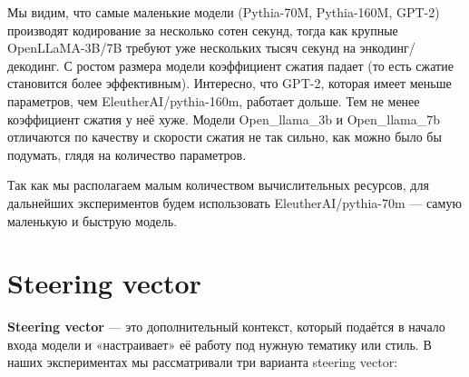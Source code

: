 \documentclass[a4paper,11pt]{article}
\begin{document}
\begin{table}[ht]
\centering
{}
\caption{Результаты по моделям}
\end{table}

Мы видим, что самые маленькие модели (Pythia-70M, Pythia-160M, GPT-2) производят кодирование за несколько сотен секунд, тогда как крупные OpenLLaMA-3B/7B требуют уже нескольких тысяч секунд на энкодинг/декодинг. С ростом размера модели коэффициент сжатия падает (то есть сжатие становится более эффективным). Интересно, что GPT-2, которая имеет меньше параметров, чем EleutherAI/pythia-160m, работает дольше. Тем не менее коэффициент сжатия у неё хуже. Модели Open\_llama\_3b и Open\_llama\_7b отличаются по качеству и скорости сжатия не так сильно, как можно было бы подумать, глядя на количество параметров.

Так как мы располагаем малым количеством вычислительных ресурсов, для дальнейших экспериментов будем использовать EleutherAI/pythia-70m — самую маленькую и быструю модель.

\section*{Steering vector}

\textbf{Steering vector} — это дополнительный контекст, который подаётся в начало входа модели и «настраивает» её работу под нужную тематику или стиль. В наших экспериментах мы рассматривали три варианта steering vector:
\end{document}
